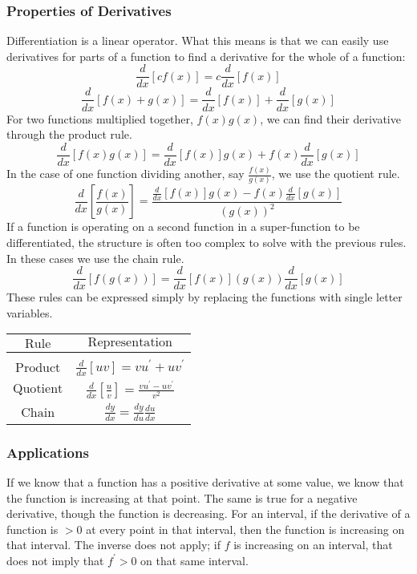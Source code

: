 \documentclass[12pt]{report}
\begin{document}
\begin{flushleft}
\subsubsection*{Properties of Derivatives}
Differentiation is a linear operator. What this means is that we can easily
use derivatives for parts of a function to find a derivative for the whole
of a function:
\[\frac{d}{dx}[cf(x)] = c\frac{d}{dx}[f(x)]\]
\[\frac{d}{dx}[f(x) + g(x)] = \frac{d}{dx}[f(x)] + \frac{d}{dx}[g(x)]\]
For two functions multiplied together, \(f(x)g(x)\), we can find their 
derivative through the product rule.
\[\frac{d}{dx}[f(x)g(x)] = \frac{d}{dx}[f(x)]g(x) + f(x)\frac{d}{dx}[g(x)]\]
In the case of one function dividing another, say \(\frac{f(x)}{g(x)}\), we use
the quotient rule.
\[\frac{d}{dx}\left[\frac{f(x)}{g(x)}\right] = \frac{\frac{d}{dx}[f(x)]g(x) -
f(x)\frac{d}{dx}[g(x)]}{(g(x))^2}\]
If a function is operating on a second function in a super-function to be 
differentiated, the structure is often too complex to solve with the previous
rules. In these cases we use the chain rule.
\[\frac{d}{dx}[f(g(x))] = \frac{d}{dx}[f(x)](g(x))\frac{d}{dx}[g(x)]\]
These rules can be expressed simply by replacing the functions with single
letter variables.
\begin{center}
    \begin{tabular}{||c|c||}
        \(\mathrm{Rule}\) & \(\mathrm{Representation}\) \\
        \hline
        & \\[-5pt]
        \(\mathrm{Product}\) & \(\frac{d}{dx}[uv] = 
        vu^\prime + uv^\prime\) \\[7pt]
        \(\mathrm{Quotient}\) & \(\frac{d}{dx}\left[\frac{u}{v}\right] = 
        \frac{vu^\prime - uv^\prime}{v^2}\) \\[7pt]
        \(\mathrm{Chain}\) & \(\frac{dy}{dx} = 
        \frac{dy}{du}\frac{du}{dx}\) \\[7pt]
    \end{tabular}
\end{center}

\subsubsection*{Applications}
If we know that a function has a positive derivative at some value, we know
that the function is increasing at that point. The same is true for a negative
derivative, though the function is decreasing. For an interval, if the 
derivative of a function is \(> 0\) at every point in that interval, then the
function is increasing on that interval. The inverse does not apply; if \(f\) 
is increasing on an interval, that does not imply that \(f^\prime > 0\) on that
same interval.


\end{flushleft}
\end{document}
